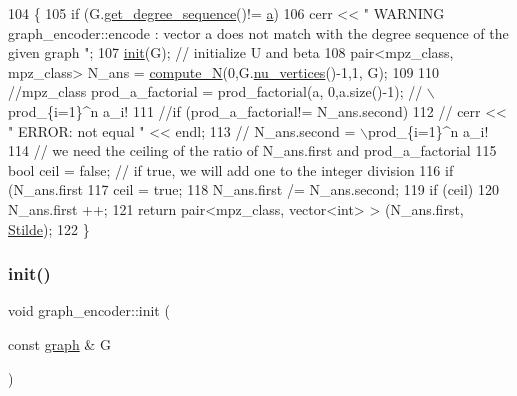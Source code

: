 \begin{DoxyCode}
104                                                                  \{
105   \textcolor{keywordflow}{if} (G.\hyperlink{classgraph_afdca627df7fb93a7d1d8a547f616e948}{get\_degree\_sequence}()!= \hyperlink{classgraph__encoder_a56eb5cf480ae5c2fca9f3a45f2ffd4f1}{a})
106     cerr << \textcolor{stringliteral}{" WARNING graph\_encoder::encode : vector a does not match with the degree sequence of the given
       graph "};
107   \hyperlink{classgraph__encoder_a6cfb6fca4bc50d4e5d267060a91f43c3}{init}(G); \textcolor{comment}{// initialize U and beta }
108   pair<mpz\_class, mpz\_class> N\_ans  = \hyperlink{classgraph__encoder_ae7273c47d6dab8367daa5ee6a9cdbc72}{compute\_N}(0,G.\hyperlink{classgraph_a70a6e0e4e0a874ab122405abd38f83cd}{nu\_vertices}()-1,1, G);
109 
110   \textcolor{comment}{//mpz\_class prod\_a\_factorial = prod\_factorial(a, 0,a.size()-1); // \(\backslash\)prod\_\{i=1\}^n a\_i!}
111   \textcolor{comment}{//if (prod\_a\_factorial!= N\_ans.second)}
112   \textcolor{comment}{//  cerr << " ERROR: not equal " << endl;}
113   \textcolor{comment}{// N\_ans.second = \(\backslash\)prod\_\{i=1\}^n a\_i!}
114   \textcolor{comment}{// we need the ceiling of the ratio of N\_ans.first and prod\_a\_factorial}
115   \textcolor{keywordtype}{bool} ceil = \textcolor{keyword}{false}; \textcolor{comment}{// if true, we will add one to the integer division}
116   \textcolor{keywordflow}{if} (N\_ans.first %
117     ceil = \textcolor{keyword}{true};
118   N\_ans.first /= N\_ans.second;
119   \textcolor{keywordflow}{if} (ceil)
120     N\_ans.first ++;
121   \textcolor{keywordflow}{return} pair<mpz\_class, vector<int> > (N\_ans.first, \hyperlink{classgraph__encoder_a342688a3fdee511b7fae3f155cfb10cf}{Stilde});
122 \}
\end{DoxyCode}
\mbox{\label{classgraph__encoder_a6cfb6fca4bc50d4e5d267060a91f43c3}} 
\subsubsection{\texorpdfstring{init()}{init()}}
{\footnotesize\ttfamily void graph\+\_\+encoder\+::init (\begin{DoxyParamCaption}\item[{const \hyperlink{classgraph}{graph} \&}]{G }\end{DoxyParamCaption})}




